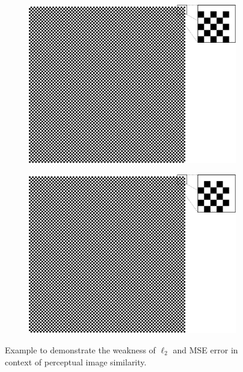 \begin{figure}[htpb]
\centering
\begin{subfigure}{0.5\textwidth}
  \centering
  \includegraphics[width=.8\linewidth]{figures/chess1.pdf}
  \caption{}
  \label{fig:chess1}
\end{subfigure}%
\begin{subfigure}{0.5\textwidth}
  \centering
  \includegraphics[width=.8\linewidth]{figures/chess2.pdf}
  \caption{}
  \label{fig:chess2}
\end{subfigure}
\caption[Example of $ \ell_{2} $ Weakness]{Example to demonstrate the weakness of $ \ell_{2} $ and MSE error in context of perceptual image similarity.} \label{fig:chessfield}
\end{figure}

